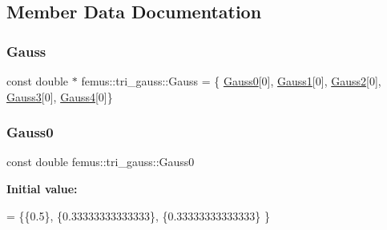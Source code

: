 \subsection{Member Data Documentation}
\mbox{\label{classfemus_1_1tri__gauss_aebd5ddfd7b54fdb31369a177fb497443}} 
\subsubsection{\texorpdfstring{Gauss}{Gauss}}
{\footnotesize\ttfamily const double $\ast$ femus\+::tri\+\_\+gauss\+::\+Gauss = \{ \mbox{\hyperlink{classfemus_1_1tri__gauss_acfc6fe119f422f6029799e9cca8d18af}{Gauss0}}\mbox{[}0\mbox{]}, \mbox{\hyperlink{classfemus_1_1tri__gauss_adad211d24c85b9bb89f94a9ce18a6b59}{Gauss1}}\mbox{[}0\mbox{]}, \mbox{\hyperlink{classfemus_1_1tri__gauss_abe733df39c92f92d3ae8f77dccd315ce}{Gauss2}}\mbox{[}0\mbox{]}, \mbox{\hyperlink{classfemus_1_1tri__gauss_a32b1a6dbc2e4f4d27f8939250b5611b6}{Gauss3}}\mbox{[}0\mbox{]}, \mbox{\hyperlink{classfemus_1_1tri__gauss_a9a95b70f7608299b2787acb925250ae0}{Gauss4}}\mbox{[}0\mbox{]}\}\hspace{0.3cm}{\ttfamily [static]}}

\mbox{\label{classfemus_1_1tri__gauss_acfc6fe119f422f6029799e9cca8d18af}} 
\subsubsection{\texorpdfstring{Gauss0}{Gauss0}}
{\footnotesize\ttfamily const double femus\+::tri\+\_\+gauss\+::\+Gauss0\hspace{0.3cm}{\ttfamily [static]}}

{\bfseries Initial value\+:}
\begin{DoxyCode}
= \{\{0.5\},
    \{0.33333333333333\},
    \{0.33333333333333\}
  \}
\end{DoxyCode}
\mbox{\label{classfemus_1_1tri__gauss_adad211d24c85b9bb89f94a9ce18a6b59}} 

